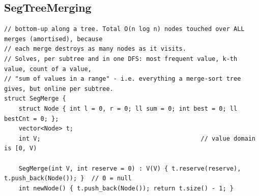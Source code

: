 \documentclass[9pt,a4paper,twocolumn]{extarticle}
\begin{document}
\subsection{SegTreeMerging}
\nopagebreak
\begin{lstlisting}
// bottom-up along a tree. Total O(n log n) nodes touched over ALL merges (amortised), because
// each merge destroys as many nodes as it visits.
// Solves, per subtree and in one DFS: most frequent value, k-th value, count of a value,
// "sum of values in a range" - i.e. everything a merge-sort tree gives, but online per subtree.
struct SegMerge {
    struct Node { int l = 0, r = 0; ll sum = 0; int best = 0; ll bestCnt = 0; };
    vector<Node> t;
    int V;                                            // value domain is [0, V)

    SegMerge(int V, int reserve = 0) : V(V) { t.reserve(reserve), t.push_back(Node()); }  // 0 = null
    int newNode() { t.push_back(Node()); return t.size() - 1; }


\end{lstlisting}
\end{document}
